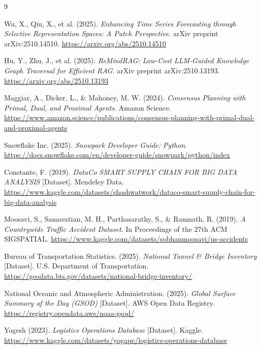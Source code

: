 \documentclass[14.5pt,letterpaper]{article}
\begin{document}
\newpage
\begin{thebibliography}{9}

Wu, X., Qiu, X., et al. (2025).
\textit{Enhancing Time Series Forecasting through Selective Representation Spaces: A Patch Perspective}.
arXiv preprint arXiv:2510.14510.
\url{https://arxiv.org/abs/2510.14510}

Hu, Y., Zhu, J., et al. (2025).
\textit{ReMindRAG: Low-Cost LLM-Guided Knowledge Graph Traversal for Efficient RAG}.
arXiv preprint arXiv:2510.13193.
\url{https://arxiv.org/abs/2510.13193}

Maggiar, A., Dicker, L., \& Mahoney, M. W. (2024).
\textit{Consensus Planning with Primal, Dual, and Proximal Agents}.
Amazon Science.
\url{https://www.amazon.science/publications/consensus-planning-with-primal-dual-and-proximal-agents}

Snowflake Inc. (2025).
\textit{Snowpark Developer Guide: Python}.
\url{https://docs.snowflake.com/en/developer-guide/snowpark/python/index}

Constante, F. (2019).
\textit{DataCo SMART SUPPLY CHAIN FOR BIG DATA ANALYSIS} [Dataset].
Mendeley Data.
\url{https://www.kaggle.com/datasets/shashwatwork/dataco-smart-supply-chain-for-big-data-analysis}

Moosavi, S., Samavatian, M. H., Parthasarathy, S., \& Ramnath, R. (2019).
\textit{A Countrywide Traffic Accident Dataset}.
In Proceedings of the 27th ACM SIGSPATIAL.
\url{https://www.kaggle.com/datasets/sobhanmoosavi/us-accidents}

Bureau of Transportation Statistics. (2025).
\textit{National Tunnel \& Bridge Inventory} [Dataset].
U.S. Department of Transportation.
\url{https://geodata.bts.gov/datasets/national-bridge-inventory/}

National Oceanic and Atmospheric Administration. (2025).
\textit{Global Surface Summary of the Day (GSOD)} [Dataset].
AWS Open Data Registry.
\url{https://registry.opendata.aws/noaa-gsod/}

Yogesh (2023).
\textit{Logistics Operations Database} [Dataset].
Kaggle.
\url{https://www.kaggle.com/datasets/yogape/logistics-operations-database}

\end{thebibliography}
\end{document}
